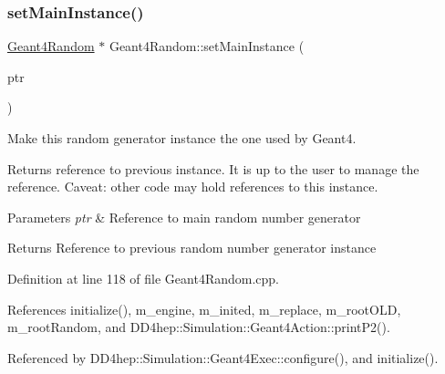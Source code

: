 \hypertarget{class_d_d4hep_1_1_simulation_1_1_geant4_random_a544fa42f6ae0d64697e366da5e1297b2}{}\label{class_d_d4hep_1_1_simulation_1_1_geant4_random_a544fa42f6ae0d64697e366da5e1297b2} 
\subsubsection{\texorpdfstring{set\+Main\+Instance()}{setMainInstance()}}
{\footnotesize\ttfamily \hyperlink{class_d_d4hep_1_1_simulation_1_1_geant4_random}{Geant4\+Random} $\ast$ Geant4\+Random\+::set\+Main\+Instance (\begin{DoxyParamCaption}\item[{\hyperlink{class_d_d4hep_1_1_simulation_1_1_geant4_random}{Geant4\+Random} $\ast$}]{ptr }\end{DoxyParamCaption})\hspace{0.3cm}{\ttfamily [static]}}



Make this random generator instance the one used by Geant4. 

Returns reference to previous instance. It is up to the user to manage the reference. Caveat\+: other code may hold references to this instance.


\begin{DoxyParams}{Parameters}
{\em ptr} & Reference to main random number generator \\
\hline
\end{DoxyParams}
\begin{DoxyReturn}{Returns}
Reference to previous random number generator instance 
\end{DoxyReturn}


Definition at line 118 of file Geant4\+Random.\+cpp.



References initialize(), m\+\_\+engine, m\+\_\+inited, m\+\_\+replace, m\+\_\+root\+O\+LD, m\+\_\+root\+Random, and D\+D4hep\+::\+Simulation\+::\+Geant4\+Action\+::print\+P2().



Referenced by D\+D4hep\+::\+Simulation\+::\+Geant4\+Exec\+::configure(), and initialize().

\hypertarget{class_d_d4hep_1_1_simulation_1_1_geant4_random_a67c43b5a941c94c3bbf7d134274bbde8}{}\label{class_d_d4hep_1_1_simulation_1_1_geant4_random_a67c43b5a941c94c3bbf7d134274bbde8} 
